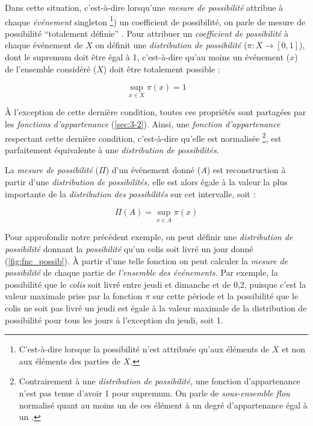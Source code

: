 Dans cette situation, c'est-à-dire lorsqu'une \emph{mesure de
  possibilité} attribue à chaque \emph{événement} singleton
\footnote{C'est-à-dire lorsque la possibilité n'est attribuée qu'aux
  éléments de \(X\) et non aux éléments des parties de \(X\).}) un
coefficient de possibilité, on parle de mesure de possibilité
\enquote{totalement définie} \autocite{Bouchon-Meunier2007}. Pour
attribuer un \emph{coefficient de possibilité} à chaque événement de
\(X\) on définit une \emph{distribution de possibilité}
(\(π : X → [0,1]\)), dont le supremum doit être égal à 1, c'est-à-dire
qu'au moins un événement (\(x\)) de l'ensemble considéré (\(X\)) doit
être totalement possible :

\begin{equation}
  \sup_{x ∈ X}π(x)=1
\end{equation}

À l'exception de cette dernière condition, toutes ces propriétés sont
partagées par les \emph{fonctions d'appartenance}
(\autoref{sec:3-2}). Ainsi, une \emph{fonction d'appartenance}
respectant cette dernière condition, c'est-à-dire qu'elle est
normalisée \footnote{Contrairement à une \emph{distribution de
    possibilité,} une fonction d'appartenance n'est pas tenue d'avoir
  1 pour supremum. On parle de \emph{sous-ensemble flou} normalisé
  quant au moins un de ces élément à un degré d’appartenance égal à un
  \autocite{Bouchon-Meunier2007}.}, est parfaitement équivalente à une
\emph{distribution de possibilités.}

La \emph{mesure de possibilité} (\(\Pi\)) d'un événement donné (\(A\))
est reconstruction à partir d'une \emph{distribution de possibilités,}
elle est alors égale à la valeur la plus importante de la
\emph{distribution des possibilités} sur cet intervalle, soit :

\begin{equation}
  \Pi(A) = \sup_{x \in A}\pi(x)
\end{equation}

Pour approfondir notre précédent exemple, on peut définir une
\emph{distribution de possibilité} donnant la \emph{possibilité} qu'un
colis soit livré un jour donné (\autoref{fig:fnc_possib}). À partir
d'une telle fonction on peut calculer la \emph{mesure de possibilité}
de chaque partie de \emph{l'ensemble des événements.} Par exemple, la
possibilité que le \emph{colis} soit livré entre jeudi et dimanche et
de 0,2, puisque c'est la valeur maximale prise par la fonction \(\pi\)
sur cette période et la possibilité que le colis ne soit pas livré un
jeudi est égale à la valeur maximale de la distribution de possibilité
pour tous les jours à l'exception du jeudi, soit 1.

